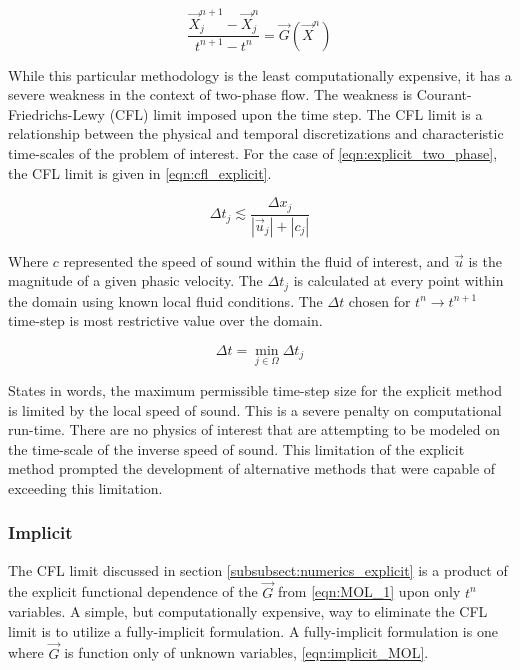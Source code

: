 \begin{equation}
\label{eqn:explicit_two_phase}
\frac{ \vec{X}^{n+1}_{j} - \vec{X}^{n}_{j}}{t^{n+1}-t^{n}} = \vec{G}(\vec{X}^{n})
\end{equation}

While this particular methodology is the least computationally expensive, it has a severe weakness in the context of two-phase flow.
The weakness is Courant-Friedrichs-Lewy (CFL) limit imposed upon the time step.
The CFL limit is a relationship between the physical and temporal discretizations and characteristic time-scales of the problem of interest.
For the case of \eqref{eqn:explicit_two_phase}, the CFL limit is given in \eqref{eqn:cfl_explicit}.

\begin{equation}
\label{eqn:cfl_explicit}
\Delta t_j \lesssim \frac{\Delta x_j}{|\vec{u}_j|+|c_j|}
\end{equation}

Where $c$ represented the speed of sound within the fluid of interest, and $\vec{u}$ is the magnitude of a given phasic velocity.
The $\Delta t_j$ is calculated at every point within the domain using known local fluid conditions.
The $\Delta t$ chosen for $t^{n} \rightarrow t^{n+1}$ time-step is most restrictive value over the domain.

\begin{equation}
\label{eqn:global_cfl}
\Delta t = \min_{j \in \Omega} \Delta t_j
\end{equation}

States in words, the maximum permissible time-step size for the explicit method is limited by the local speed of sound.
This is a severe penalty on computational run-time.
There are no physics of interest that are attempting to be modeled on the time-scale of the inverse speed of sound.
This limitation of the explicit method prompted the development of alternative methods that were capable of exceeding this limitation.

\subsubsection{Implicit}
\label{subsubsect:numerics_fully_implicit}
The CFL limit discussed in section \ref{subsubsect:numerics_explicit} is a product of the explicit functional dependence of the $\vec{G}$ from \eqref{eqn:MOL_1} upon only $t^n$ variables.
A simple, but computationally expensive, way to eliminate the CFL limit is to utilize a fully-implicit formulation.
A fully-implicit formulation is one where $\vec{G}$ is function only of unknown variables, \eqref{eqn:implicit_MOL}.

